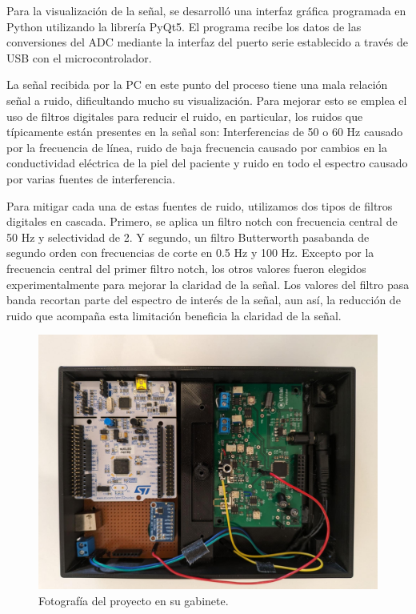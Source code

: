 \documentclass[conference]{IEEEtran}
\begin{document}
Para la visualización de la señal, se desarrolló una interfaz gráfica programada
en Python utilizando la librería PyQt5. El programa recibe los datos de las
conversiones del ADC mediante la interfaz del puerto serie establecido a través de
USB con el microcontrolador.

La señal recibida por la PC en este punto del proceso tiene una mala relación señal a
ruido, dificultando mucho su visualización. Para mejorar esto se emplea el uso de
filtros digitales para reducir el ruido, en particular, los ruidos que típicamente
están presentes en la señal son: Interferencias de 50 o 60 Hz causado por la
frecuencia de línea, ruido de baja frecuencia causado por cambios en la conductividad
eléctrica de la piel del paciente y ruido en todo el espectro causado por varias
fuentes de interferencia.

Para mitigar cada una de estas fuentes de ruido, utilizamos dos tipos de filtros
digitales en cascada. Primero, se aplica un filtro notch con frecuencia central de
50 Hz y selectividad de 2. Y segundo, un filtro Butterworth pasabanda de segundo
orden con frecuencias de corte en 0.5 Hz y 100 Hz. Excepto por la frecuencia central
del primer filtro notch, los otros valores fueron elegidos experimentalmente para
mejorar la claridad de la señal. Los valores del filtro pasa banda recortan parte
del espectro de interés de la señal, aun así, la reducción de ruido que acompaña
esta limitación beneficia la claridad de la señal.


\begin{figure}[thb]
    \centerline{\includegraphics[width=\linewidth]{figs/foto_proyecto.jpeg}}
    \caption{Fotografía del proyecto en su gabinete.}
    \label{fig:foto_proyecto}
    \end{figure}
\end{document}

